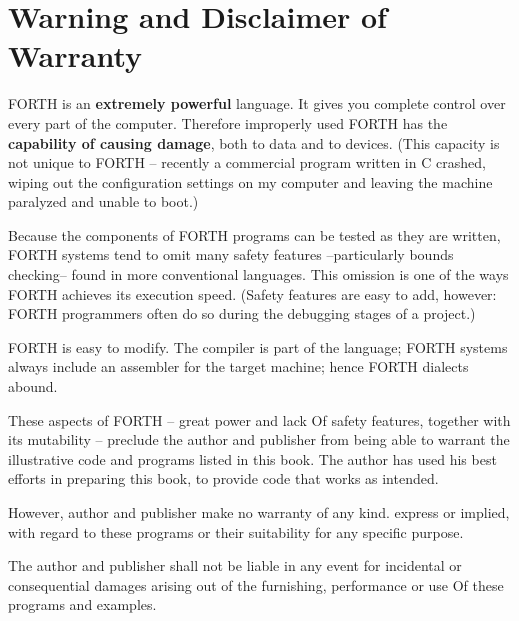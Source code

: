 
\chapter*{Warning and Disclaimer of Warranty}
FORTH is an \textbf{extremely powerful} language. It gives you complete control over every part of the computer. Therefore improperly used FORTH has the \textbf{capability of causing damage}, both to data and to devices. (This capacity is not unique to FORTH -- recently a commercial program written in C crashed, wiping out the configuration settings on my computer and leaving the machine paralyzed and unable to boot.) 

Because the components of FORTH programs can be tested as they are written, FORTH systems tend to omit many safety features --particularly bounds checking-- found in more conventional languages. This omission is one of the ways FORTH achieves its execution speed. (Safety features are easy to add, however: FORTH programmers often do so during the debugging stages of a project.)

FORTH is easy to modify. The compiler is part of the language; FORTH systems always include an assembler for the target machine; hence FORTH dialects abound.

These aspects of FORTH -- great power and lack Of safety features, together with its mutability -- preclude the author and publisher from being able to warrant the illustrative code and programs listed in this book. The author has used his best efforts in preparing this book, to provide code that works as intended.

\leftbar[1\linewidth]
However, author and publisher make no warranty of any kind. express or implied, with regard to these programs or their suitability for any specific purpose.
\endleftbar

\leftbar[1\linewidth]
The author and publisher shall not be liable in any event for incidental or consequential damages arising out of the furnishing, performance or use Of these programs and examples.
\endleftbar